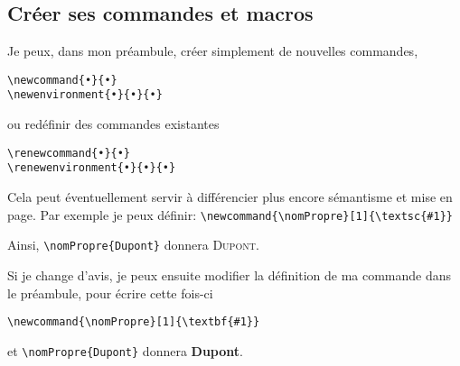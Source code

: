 \documentclass[a4paper,twoside,french,12pt]{book}
\newcommand{\nomPropre}[1]{\textsc{#1}}
\begin{document}
\subsection{Créer ses commandes et macros}

Je peux, dans mon préambule, créer simplement de nouvelles commandes,

\begin{verbatim}
\newcommand{•}{•}
\newenvironment{•}{•}{•}
\end{verbatim}

 ou redéfinir des commandes existantes
 
 \begin{verbatim}
\renewcommand{•}{•}
\renewenvironment{•}{•}{•}
\end{verbatim}
 
Cela peut éventuellement servir à différencier plus encore sémantisme et mise en page. Par exemple je peux définir: \verb=\newcommand{\nomPropre}[1]{\textsc{#1}} =

Ainsi, \verb=\nomPropre{Dupont}= donnera \nomPropre{Dupont}. 

Si je change d'avis, je peux ensuite modifier la définition de ma commande dans le préambule, pour écrire cette fois-ci

 \verb=\newcommand{\nomPropre}[1]{\textbf{#1}} =
 
  et \verb=\nomPropre{Dupont}= donnera \textbf{Dupont}. %




\cleardoublepage

\printindex[etude]

\printindex[edition]

\clearpage

\tableofcontents
\end{document}
